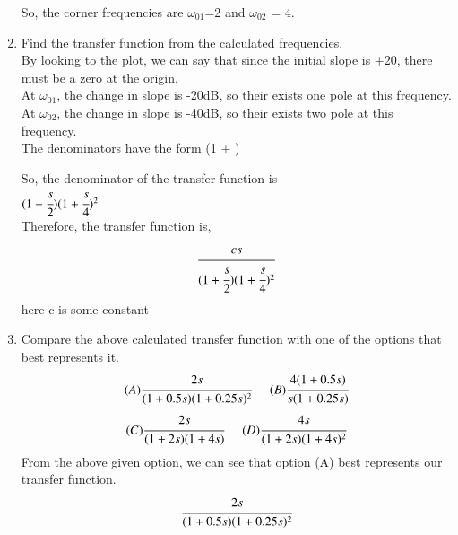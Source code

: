 \begin{enumerate}[label=\thesection.\arabic*.,ref=\thesection.\theenumi]
So, the corner frequencies are $\omega_{01}$=2 and $\omega_{02}$ = 4.\\

\item Find the transfer function from the calculated frequencies.\\
\solution
By looking to the plot, we can say that since the initial slope is +20, there must be a zero at the origin.\\
At $\omega_{01}$, the change in slope is -20dB, so their exists one pole at this frequency.\\
At $\omega_{02}$, the change in slope is -40dB, so their exists two pole at this frequency.\\
The denominators have the form (1 + )

So, the denominator of the transfer function is\\ $(1 + \cfrac{s}{2})(1 + \cfrac{s}{4})^2$\\
Therefore, the transfer function is,
\begin{align*}
    \cfrac{cs}{(1 + \cfrac{s}{2})(1 + \cfrac{s}{4})^2} 
\end{align*}
here c is some constant\\

\item Compare the above calculated transfer function with one of the options that best represents it.
\begin{multline*}
    (A) \cfrac{2s}{(1+0.5s)(1+0.25s)^2}\hspace{0.5cm}
    (B) \cfrac{4(1+0.5s)}{s(1+0.25s)}
\end{multline*}
\begin{multline*}
    (C) \cfrac{2s}{(1+2s)(1+4s)}\hspace{0.5cm}
    (D) \cfrac{4s}{(1+2s)(1+4s)^2}
\end{multline*}
\solution
From the above given option, we can see that option (A) best represents our transfer function.
\begin{align*}
     \cfrac{2s}{(1+0.5s)(1+0.25s)^2}
\end{align*}{}


\end{enumerate}
